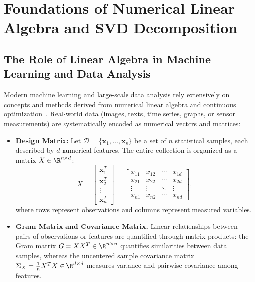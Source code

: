 \chapter{Foundations of Numerical Linear Algebra and SVD Decomposition}
\label{chap:foundations-linear-algebra-svd}

\FloatBarrier
\section{The Role of Linear Algebra in Machine Learning and Data Analysis}

Modern machine learning and large-scale data analysis rely extensively on concepts and methods derived from numerical linear algebra and continuous optimization~\cite{strang2019linear,golub2013matrix}. Real-world data (images, texts, time series, graphs, or sensor measurements) are systematically encoded as numerical vectors and matrices:

\begin{itemize}
    \item \textbf{Design Matrix:} Let $\mathcal{D} = \{\mathbf{x}_1, \dots, \mathbf{x}_n\}$ be a set of $n$ statistical samples, each described by $d$ numerical features. The entire collection is organized as a matrix $X \in \R^{n \times d}$:
    \begin{equation}
        X = \begin{bmatrix}
            \mathbf{x}_1^T \\
            \mathbf{x}_2^T \\
            \vdots \\
            \mathbf{x}_n^T
        \end{bmatrix} = \begin{bmatrix}
            x_{11} & x_{12} & \cdots & x_{1d} \\
            x_{21} & x_{22} & \cdots & x_{2d} \\
            \vdots & \vdots & \ddots & \vdots \\
            x_{n1} & x_{n2} & \cdots & x_{nd}
        \end{bmatrix},
    \end{equation}
    where rows represent observations and columns represent measured variables.
    \item \textbf{Gram Matrix and Covariance Matrix:} Linear relationships between pairs of observations or features are quantified through matrix products: the Gram matrix $G = X X^T \in \R^{n \times n}$ quantifies similarities between data samples, whereas the uncentered sample covariance matrix $\Sigma_X = \frac{1}{n} X^T X \in \R^{d \times d}$ measures variance and pairwise covariance among features.
\end{itemize}

